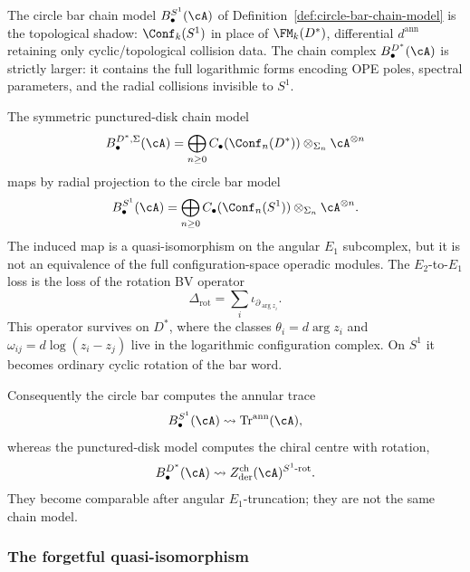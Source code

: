 The circle bar chain model
$B^{S^1}_\bullet(\cA)$
of Definition~\ref{def:circle-bar-chain-model}
is the topological shadow: $\Conf_k(S^1)$ in place of $\FM_k(D^*)$, differential $d^{\mathrm{ann}}$ retaining only cyclic/topological collision data. The chain complex
$B^{D^*}_\bullet(\cA)$ is strictly larger: it contains
the full logarithmic forms encoding OPE poles,
spectral parameters, and the radial collisions
invisible to $S^1$.

\begin{proposition}
\label{prop:punctured-disk-circle-rotation-gap}
The symmetric punctured-disk chain model
\begin{equation}\label{eq:punctured-disk-symmetric-bar}
B^{D^*,\Sigma}_\bullet(\cA)
=
\bigoplus_{n\ge0}
C_\bullet(\Conf_n(D^*))\otimes_{\Sigma_n}\cA^{\otimes n}
\end{equation}
maps by radial projection to the circle bar model
\[
B^{S^1}_\bullet(\cA)
=
\bigoplus_{n\ge0}
C_\bullet(\Conf_n(S^1))\otimes_{\Sigma_n}\cA^{\otimes n}.
\]
The induced map is a quasi-isomorphism on the angular \(E_1\)
subcomplex, but it is not an equivalence of the full
configuration-space operadic modules. The \(E_2\)-to-\(E_1\) loss is
the loss of the rotation BV operator
\begin{equation}\label{eq:punctured-disk-rotation-bv}
\Delta_{\mathrm{rot}}
=
\sum_i\iota_{\partial_{\arg z_i}}.
\end{equation}
This operator survives on \(D^*\), where the classes
\(\theta_i=d\arg z_i\) and \(\omega_{ij}=d\log(z_i-z_j)\) live in the
logarithmic configuration complex. On \(S^1\) it becomes ordinary
cyclic rotation of the bar word.

Consequently the circle bar computes the annular trace
\[
B^{S^1}_\bullet(\cA)\rightsquigarrow
\operatorname{Tr}^{\mathrm{ann}}(\cA),
\]
whereas the punctured-disk model computes the chiral centre with
rotation,
\[
B^{D^*}_\bullet(\cA)\rightsquigarrow
Z_{\mathrm{der}}^{\mathrm{ch}}(\cA)^{S^1\text{-}\mathrm{rot}}.
\]
They become comparable after angular \(E_1\)-truncation; they are not
the same chain model.
\end{proposition}

\subsubsection{The forgetful quasi-isomorphism}

